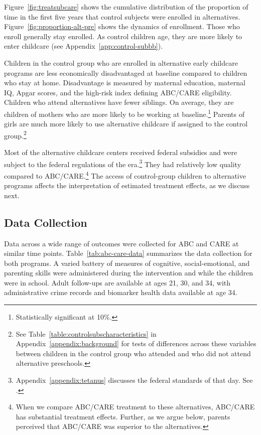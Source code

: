 Figure~\ref{fig:treatsubcare} shows the cumulative distribution of the proportion of time in the first five years that control subjects were enrolled in alternatives. Figure~\ref{fig:proportion-alt-pre} shows the dynamics of enrollment. Those who enroll generally stay enrolled. As control children age, they are more likely to enter childcare (see Appendix~\ref{app:control-subbb}).

Children in the control group who are enrolled in alternative early childcare programs are less economically disadvantaged at baseline compared to children who stay at home. Disadvantage is measured by maternal education, maternal IQ, Apgar scores, and the high-risk index defining ABC/CARE eligibility. Children who attend alternatives have fewer siblings. On average, they are children of mothers who are more likely to be working at baseline.\footnote{Statistically significant at 10\%.} Parents of girls are much more likely to use alternative childcare if assigned to the control group.\footnote{See Table~\ref{table:controlsubscharacteristics} in Appendix~\ref{appendix:background} for tests of differences across these variables between children in the control group who attended and who did not attend alternative preschools.}

Most of the alternative childcare centers received federal subsidies and were subject to the federal regulations of the era.\footnote{Appendix~\ref{appendix:tetanus} discusses the federal standards of that day. See \citet{Department-of-Health_1968_DayCareRequirements,NCGA_1971_House-Bill-100,Ramey-et-al_1977_Intro-to-ABC,Ramey_Campbell_1979_SR,Ramey_McGinness_etal_1982_Abecedarianapproach, Burchinal_Campbell_etal_1997_CD}.} They had relatively low quality compared to ABC/CARE.\footnote{When we compare ABC/CARE treatment to these alternatives, ABC/CARE has substantial treatment effects. Further, as we argue below, parents perceived that ABC/CARE was superior to the alternatives.} The access of control-group children to alternative programs affects the interpretation of estimated treatment effects, as we discuss next.

\subsection{Data Collection} \label{section:data-collection}

Data across a wide range of outcomes were collected for ABC and CARE at similar time points. Table~\ref{tab:abc-care-data} summarizes the data collection for both programs. A varied battery of measures of cognitive, social-emotional, and parenting skills were administered during the intervention and while the children were in school. Adult follow-ups are available at ages 21, 30, and 34, with administrative crime records and biomarker health data available at age 34.

